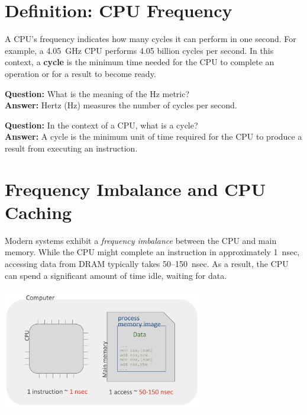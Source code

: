 \section{Definition: CPU Frequency}

A CPU’s frequency indicates how many cycles it can perform in one second. For example, a 4.05~GHz CPU performs 4.05 billion cycles per second. In this context, a \textbf{cycle} is the minimum time needed for the CPU to complete an operation or for a result to become ready.

\vspace{0.5em}
{\textbf{Question:} What is the meaning of the Hz metric?}\\[0.5em]
\textbf{Answer:} Hertz (Hz) measures the number of cycles per second.

\vspace{0.5em}
{\textbf{Question:} In the context of a CPU, what is a cycle?}\\[0.5em]
\textbf{Answer:} A cycle is the minimum unit of time required for the CPU to produce a result from executing an instruction.

\section{Frequency Imbalance and CPU Caching}

Modern systems exhibit a \emph{frequency imbalance} between the CPU and main memory. While the CPU might complete an instruction in approximately 1~nsec, accessing data from DRAM typically takes 50–150~nsec. As a result, the CPU can spend a significant amount of time idle, waiting for data.

\begin{center}
  \includegraphics[width=0.65\textwidth]{chapters/L1/images/imbalance.png}
\end{center}

